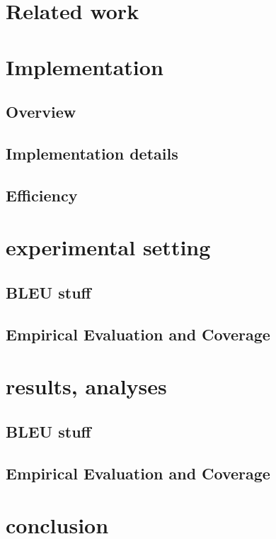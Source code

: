 \documentclass[11pt]{article}
\begin{document}
\section{Related work}

\section{Implementation}
\label{implem}
\subsection{Overview}

\subsection{Implementation details}

\subsection{Efficiency}

\section{experimental setting}

\subsection{BLEU stuff}

\subsection{Empirical Evaluation and Coverage}
\label{eval}

\section{results, analyses}

\subsection{BLEU stuff}

\subsection{Empirical Evaluation and Coverage}

\section{conclusion}

\end{document}
